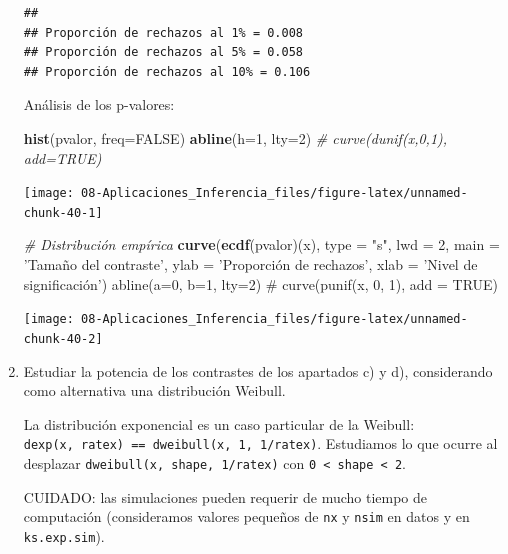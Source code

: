 \documentclass[
]{book}
\newenvironment{Shaded}{\begin{snugshade}}{\end{snugshade}}
\newcommand{\CommentTok}[1]{\textcolor[rgb]{0.56,0.35,0.01}{\textit{#1}}}
\newcommand{\DataTypeTok}[1]{\textcolor[rgb]{0.13,0.29,0.53}{#1}}
\newcommand{\DecValTok}[1]{\textcolor[rgb]{0.00,0.00,0.81}{#1}}
\newcommand{\KeywordTok}[1]{\textcolor[rgb]{0.13,0.29,0.53}{\textbf{#1}}}
\newcommand{\NormalTok}[1]{#1}
\newcommand{\OtherTok}[1]{\textcolor[rgb]{0.56,0.35,0.01}{#1}}
\newcommand{\StringTok}[1]{\textcolor[rgb]{0.31,0.60,0.02}{#1}}
\theoremstyle{break}
\theoremstyle{definition}
\theoremstyle{definition}
\theoremstyle{definition}
\theoremstyle{remark}
\begin{document}
\begin{enumerate}
\begin{verbatim}
## 
## Proporción de rechazos al 1% = 0.008 
## Proporción de rechazos al 5% = 0.058 
## Proporción de rechazos al 10% = 0.106
\end{verbatim}

  Análisis de los p-valores:

\begin{Shaded}
\begin{Highlighting}[]
\KeywordTok{hist}\NormalTok{(pvalor, }\DataTypeTok{freq=}\OtherTok{FALSE}\NormalTok{)}
\KeywordTok{abline}\NormalTok{(}\DataTypeTok{h=}\DecValTok{1}\NormalTok{, }\DataTypeTok{lty=}\DecValTok{2}\NormalTok{)   }\CommentTok{# curve(dunif(x,0,1), add=TRUE)}
\end{Highlighting}
\end{Shaded}

  \begin{center}\texttt{[image: 08-Aplicaciones\_Inferencia\_files/figure-latex/unnamed-chunk-40-1]} \end{center}

\begin{Shaded}
\begin{Highlighting}[]
\CommentTok{# Distribución empírica}
\KeywordTok{curve}\NormalTok{(}\KeywordTok{ecdf}\NormalTok{(pvalor)(x), }\DataTypeTok{type =} \StringTok{"s"}\NormalTok{, }\DataTypeTok{lwd =} \DecValTok{2}\NormalTok{, }
      \DataTypeTok{main =} \StringTok{'Tamaño del contraste'}\NormalTok{, }\DataTypeTok{ylab =} \StringTok{'Proporción de rechazos'}\NormalTok{, }
      \DataTypeTok{xlab =} \StringTok{'Nivel de significación')}
\StringTok{abline(a=0, b=1, lty=2)   # curve(punif(x, 0, 1), add = TRUE) }
\end{Highlighting}
\end{Shaded}

  \begin{center}\texttt{[image: 08-Aplicaciones\_Inferencia\_files/figure-latex/unnamed-chunk-40-2]} \end{center}
\item
  Estudiar la potencia de los contrastes de los apartados c) y d),
  considerando como alternativa una distribución Weibull.

  La distribución exponencial es un caso particular de la Weibull:
  \texttt{dexp(x,\ ratex)\ ==\ dweibull(x,\ 1,\ 1/ratex)}.
  Estudiamos lo que ocurre al desplazar \texttt{dweibull(x,\ shape,\ 1/ratex)} con \texttt{0\ \textless{}\ shape\ \textless{}\ 2}.

  CUIDADO: las simulaciones pueden requerir de mucho tiempo de computación
  (consideramos valores pequeños de \texttt{nx} y \texttt{nsim} en datos y en \texttt{ks.exp.sim}).


\end{enumerate}
\end{document}
